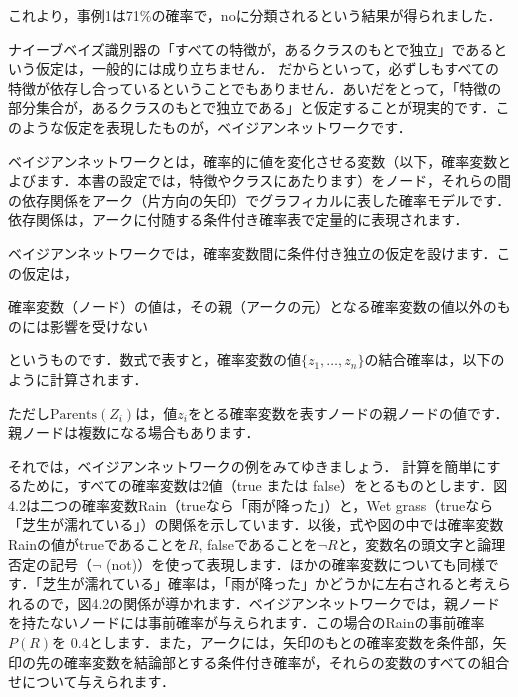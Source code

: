 

これより，事例1は71\%の確率で，noに分類されるという結果が得られました．


ナイーブベイズ識別器の「すべての特徴が，あるクラスのもとで独立」であるという仮定は，一般的には成り立ちません．
だからといって，必ずしもすべての特徴が依存し合っているということでもありません．あいだをとって，「特徴の部分集合が，あるクラスのもとで独立である」と仮定することが現実的です．このような仮定を表現したものが，ベイジアンネットワークです．

ベイジアンネットワークとは，確率的に値を変化させる変数（以下，確率変数とよびます．本書の設定では，特徴やクラスにあたります）をノード，それらの間の依存関係をアーク（片方向の矢印）でグラフィカルに表した確率モデルです．依存関係は，アークに付随する条件付き確率表で定量的に表現されます．

ベイジアンネットワークでは，確率変数間に条件付き独立の仮定を設けます．この仮定は，

確率変数（ノード）の値は，その親（アークの元）となる確率変数の値以外のものには影響を受けない

というものです．数式で表すと，確率変数の値$\{z_1,\dots,z_n\}$の結合確率は，以下のように計算されます．


ただし$\mbox{Parents}(Z_i)$は，値$z_i$をとる確率変数を表すノードの親ノードの値です．親ノードは複数になる場合もあります．


それでは，ベイジアンネットワークの例をみてゆきましょう．
計算を簡単にするために，すべての確率変数は2値（true または false）をとるものとします．図4.2は二つの確率変数Rain（trueなら「雨が降った」）と，Wet grass（trueなら「芝生が濡れている」）の関係を示しています．以後，式や図の中では確率変数Rainの値がtrueであることを$R$, falseであることを$\lnot R$と，変数名の頭文字と論理否定の記号（$\lnot$ (not)）を使って表現します．ほかの確率変数についても同様です．「芝生が濡れている」確率は，「雨が降った」かどうかに左右されると考えられるので，図4.2の関係が導かれます．ベイジアンネットワークでは，親ノードを持たないノードには事前確率が与えられます．この場合のRainの事前確率$P(R)$を
0.4とします．また，アークには，矢印のもとの確率変数を条件部，矢印の先の確率変数を結論部とする条件付き確率が，それらの変数のすべての組合せについて与えられます．




